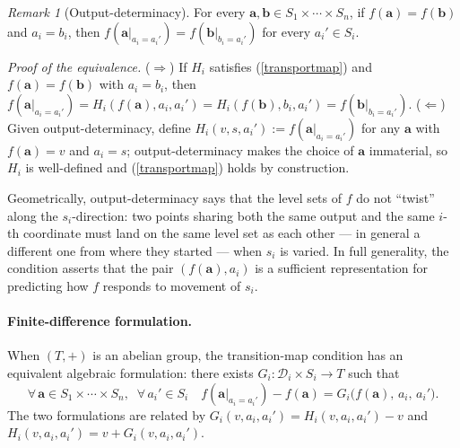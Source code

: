 \documentclass{article}
\theoremstyle{definition}
\theoremstyle{remark}
\newtheorem{remark}[proposition]{Remark}
\begin{document}
\begin{remark}[Output-determinacy]
\label{outputdeterminacy}
For every $\boldsymbol{a}, \boldsymbol{b} \in S_1 \times \cdots \times S_n$, if $f(\boldsymbol{a}) = f(\boldsymbol{b})$ and $a_i = b_i$, then $f(\boldsymbol{a}|_{a_i = a_i'}) = f(\boldsymbol{b}|_{b_i = a_i'})$ for every $a_i' \in S_i$.
\end{remark}

\noindent \textit{Proof of the equivalence.} ($\Rightarrow$) If $H_i$ satisfies (\ref{transportmap}) and $f(\boldsymbol{a}) = f(\boldsymbol{b})$ with $a_i = b_i$, then $f(\boldsymbol{a}|_{a_i = a_i'}) = H_i(f(\boldsymbol{a}), a_i, a_i') = H_i(f(\boldsymbol{b}), b_i, a_i') = f(\boldsymbol{b}|_{b_i = a_i'})$. ($\Leftarrow$) Given output-determinacy, define $H_i(v, s, a_i') := f(\boldsymbol{a}|_{a_i = a_i'})$ for any $\boldsymbol{a}$ with $f(\boldsymbol{a}) = v$ and $a_i = s$; output-determinacy makes the choice of $\boldsymbol{a}$ immaterial, so $H_i$ is well-defined and (\ref{transportmap}) holds by construction.

\noindent Geometrically, output-determinacy says that the level sets of $f$ do not ``twist'' along the $s_i$-direction: two points sharing both the same output and the same $i$-th coordinate must land on the same level set as each other --- in general a different one from where they started --- when $s_i$ is varied. In full generality, the condition asserts that the pair $(f(\boldsymbol{a}), a_i)$ is a sufficient representation for predicting how $f$ responds to movement of $s_i$.

\paragraph{Finite-difference formulation.} When $(T, +)$ is an abelian group, the transition-map condition has an equivalent algebraic formulation: there exists $G_i \colon \mathcal{D}_i \times S_i \to T$ such that
\begin{equation}
\label{finitedifference}
\forall\, \boldsymbol{a} \in S_1 \times \cdots \times S_n,\;\; \forall\, a_i' \in S_i \quad
f(\boldsymbol{a}|_{a_i = a_i'}) - f(\boldsymbol{a}) = G_i\bigl(f(\boldsymbol{a}),\, a_i,\, a_i'\bigr).
\end{equation}
The two formulations are related by $G_i(v, a_i, a_i') = H_i(v, a_i, a_i') - v$ and $H_i(v, a_i, a_i') = v + G_i(v, a_i, a_i')$.
\end{document}
